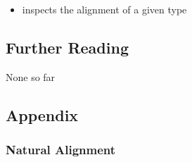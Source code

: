 \begin{itemize}
\item{%
inspects the alignment of a given type}
\end{itemize}

\subsection[Further Reading]{Further Reading}\label{further-reading}

None so far

\subsection[Appendix]{Appendix}\label{alignas-appendix}

\subsubsection[Natural Alignment]{Natural Alignment}\label{natural-alignment}

%

